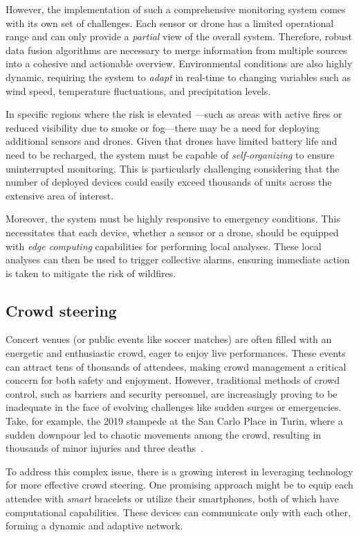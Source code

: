 \sloppypar
However, the implementation of such a comprehensive monitoring system comes with its own set of challenges. 
 Each sensor or drone has a limited operational range and can only provide a \emph{partial} view of the overall system. 
 Therefore, robust data fusion algorithms are necessary to merge information from multiple sources into a cohesive and actionable overview. 
 Environmental conditions are also highly dynamic, requiring the system to \emph{adapt} in real-time to changing variables such as wind speed, temperature fluctuations, and precipitation levels.

In specific regions where the risk is elevated
 ---such as areas with active fires or reduced visibility due to smoke or fog---there may be a need for deploying additional sensors and drones. 
 Given that drones have limited battery life and need to be recharged, 
 the system must be capable of \emph{self-organizing} to ensure uninterrupted monitoring. 
 This is particularly challenging considering that the number of deployed devices could easily exceed thousands of units across the extensive area of interest.

Moreover, the system must be highly responsive to emergency conditions. 
 This necessitates that each device, whether a sensor or a drone, 
 should be equipped with \emph{edge computing} capabilities for performing local analyses. 
 These local analyses can then be used to trigger collective alarms, 
 ensuring immediate action is taken to mitigate the risk of wildfires.
\subsection{Crowd steering}
Concert venues (or public events like soccer matches) 
 are often filled with an energetic and enthusiastic crowd, 
 eager to enjoy live performances. 
 These events can attract tens of thousands of attendees, 
 making crowd management a critical concern for both safety and enjoyment. 
% 
However, traditional methods of crowd control, 
 such as barriers and security personnel, 
 are increasingly proving to be inadequate in the face of evolving challenges like sudden surges or emergencies. 
 Take, for example, the 2019 stampede at the San Carlo Place in Turin, 
 where a sudden downpour led to chaotic movements among the crowd, 
 resulting in thousands of minor injuries and three deaths~\cite{enwiki:1164182872}.

To address this complex issue, 
 there is a growing interest in leveraging technology for more effective crowd steering. 
 One promising approach might be to equip each attendee with \emph{smart} bracelets or utilize their smartphones, 
 both of which have computational capabilities. 
 These devices can communicate only with each other, 
 forming a dynamic and adaptive network.

